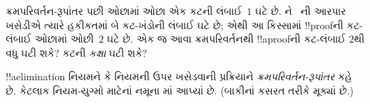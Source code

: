 \documentclass[../../../include/open-logic-section]{subfiles}
\begin{document}
\begin{prob}
ક્રમપરિવર્તન-રૂપાંતર પછી
ઓછામાં ઓછા એક
કટની લંબાઈ~$1$
ઘટે છે.
\Elim{\land}ને~\Elim{\lor}
ની આરપાર ખસેડીએ
ત્યારે હકીકતમાં
બે કટ-ખંડોની
લંબાઈ ઘટે છે;
એથી આ કિસ્સામાં
!!{proof}ની કટ-લંબાઈ
ઓછામાં ઓછી~$2$
ઘટે છે. એક જ
આવા ક્રમપરિવર્તનથી
!!a{proof}ની કટ-લંબાઈ
$2$થી વધુ ઘટી
શકે? કટની
\emph{કક્ષા} ઘટી શકે?
\end{prob}

!!a{elimination} નિયમને
\Elim{\lor} કે
\Elim{\lexists} નિયમની
ઉપર ખસેડવાની
પ્રક્રિયાને
\emph{ક્રમપરિવર્તન-રૂપાંતર}
કહે છે. કેટલાક
નિયમ-યુગ્મો માટેનાં
નમૂના
માં
આપ્યાં છે.
(બાકીનાં કસરત
તરીકે મૂક્યાં છે.)

\end{document}
